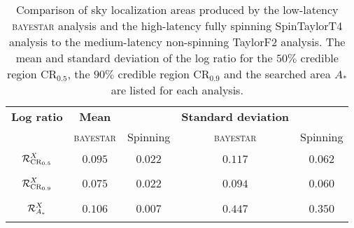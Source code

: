 \begin{table}
\begin{tabular}{ccccc}
\textbf{Log ratio} & \textbf{Mean} & & \textbf{Standard deviation} & \\   
 & \textsc{bayestar} & Spinning & \textsc{bayestar} & Spinning \\
$\displaystyle \vphantom{\frac{0}{0}} \mathcal{R}^X_{\mathrm{CR}_{0.5}}$ & $0.095$ & $0.022$ & $0.117$ & $0.062$ \\
$\displaystyle \vphantom{\frac{0}{0}} \mathcal{R}^X_{\mathrm{CR}_{0.9}}$ & $0.075$ & $0.022$ & $0.094$ & $0.060$ \\
$\displaystyle \vphantom{\frac{0}{0}} \mathcal{R}^X_{A_\ast}$ & $0.106$ & $0.007$ & $0.447$ & $0.350$
\end{tabular}
\label{tab:sky-ratio} \caption{Comparison of sky localization areas produced by the low-latency \textsc{bayestar} analysis and the high-latency fully spinning SpinTaylorT4 analysis to the medium-latency non-spinning TaylorF2 analysis. The mean and standard deviation of the log ratio for the $50\%$ credible region $\mathrm{CR}_{0.5}$, the $90\%$ credible region $\mathrm{CR}_{0.9}$ and the searched area $A_\ast$ are listed for each analysis.}

\end{table}
  
  